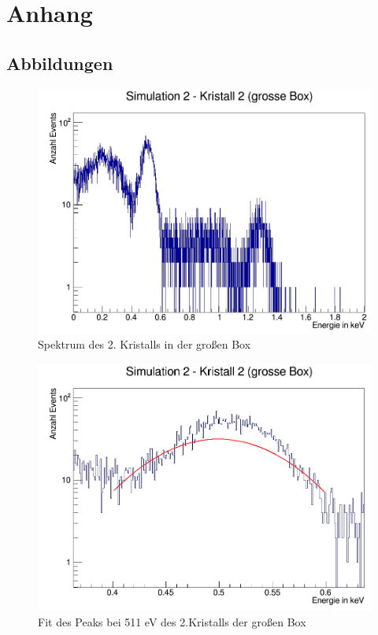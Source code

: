 \documentclass[a4paper,11pt,twoside]{article}
\begin{document}
			
			
			
			
			
\section{Anhang}
	\subsection{Abbildungen}
	
\begin{figure}[H]
	\begin{center}
		\includegraphics[width=0.7\linewidth]{Simulation2(2KGB)_ganz}
		\caption{Spektrum des 2. Kristalls in der großen Box}
		\label{}
	\end{center}
\end{figure}

\begin{figure}[H]
	\begin{center}
		\includegraphics[width=0.7\linewidth]{Simulation2(2KGB)_511_fitt}
		\caption{Fit des Peaks bei 511 eV des 2.Kristalls der großen Box}
		\label{}
	\end{center}
\end{figure}
\end{document}
